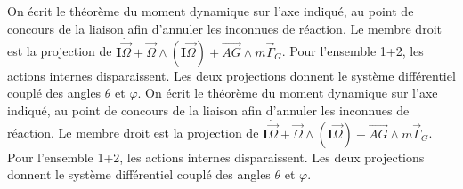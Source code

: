 \begin{corrigebox}
On écrit le théorème du moment dynamique sur l'axe indiqué, au
            point de concours de la liaison afin d'annuler les inconnues de réaction.
            Le membre droit est la projection de
            $\mathbf I\dot{\vec\Omega}+\vec\Omega\wedge(\mathbf I\vec\Omega)+
            \overrightarrow{AG}\wedge m\vec\Gamma_G$. Pour l'ensemble 1+2, les actions
            internes disparaissent. Les deux projections donnent le système différentiel
            couplé des angles $\theta$ et $\varphi$.
On écrit le théorème du moment dynamique sur l'axe indiqué, au
            point de concours de la liaison afin d'annuler les inconnues de réaction.
            Le membre droit est la projection de
            $\mathbf I\dot{\vec\Omega}+\vec\Omega\wedge(\mathbf I\vec\Omega)+
            \overrightarrow{AG}\wedge m\vec\Gamma_G$. Pour l'ensemble 1+2, les actions
            internes disparaissent. Les deux projections donnent le système différentiel
            couplé des angles $\theta$ et $\varphi$.
\end{corrigebox}
